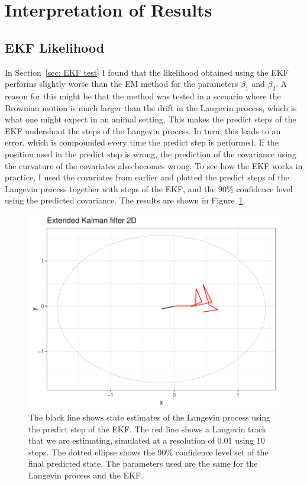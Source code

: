 

\section{Interpretation of Results}
\subsection{EKF Likelihood}
 In Section~\ref{sec: EKF test} I found that the likelihood obtained using the EKF performs slightly worse than the EM method for the parameters $\beta_1$ and $\beta_2$. A reason for this might be that the method was tested in a scenario where the Brownian motion is much larger than the drift in the Langevin process, which is what one might expect in an animal setting. This makes the predict steps of the EKF undershoot the steps of the Langevin process. In turn, this leads to an error, which is compounded every time the predict step is performed. If the position used in the predict step is wrong, the prediction of the covariance using the curvature of the covariates also becomes wrong. To see how the EKF works in practice, I used the covariates from earlier and plotted the predict steps of the Langevin process together with steps of the EKF, and the 90\% confidence level using the predicted covariance. The results are shown in Figure~\ref{fig:EKF high diffusion}. 


\begin{figure}[H]
    \centering
    \includegraphics[width=\linewidth]{Images/discussion/EKF high diffusion path.pdf}
    \caption[EKF path]{The black line shows state estimates of the Langevin process using the predict step of the EKF. The red line shows a Langevin track that we are estimating, simulated at a resolution of $0.01$ using 10 steps. The dotted ellipse shows the 90\% confidence level set of the final predicted state. The parameters used are the same for the Langevin process and the EKF.}
    \label{fig:EKF high diffusion}
\end{figure}

